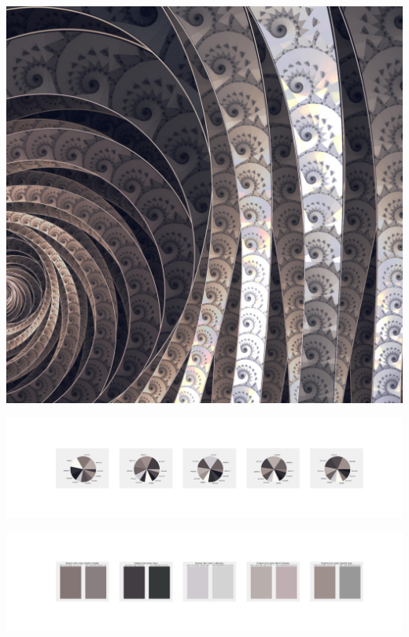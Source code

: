 \documentclass[11pt]{article}
\begin{document}
\begin{landscape}
    \begin{center}
    \includegraphics[width=\textwidth]{./nbimg/file (398).jpg}
    \end{center}

    \begin{center}
    \includegraphics[width=250mm]{./nbimg/pie-331.jpg}
    \end{center}

    \begin{center}
    \includegraphics[width=250mm]{./nbimg/peak-331.jpg}
    \end{center}
    


\end{landscape}
\end{document}

